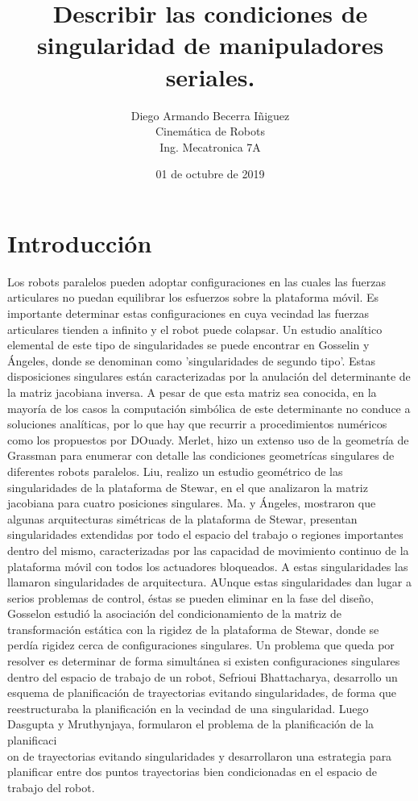 \documentclass[letter,openright,12pt,spanish]{report}
\title{\textbf{Describir las condiciones de singularidad de manipuladores seriales.}}
\author{Diego Armando Becerra Iñiguez\\
		Cinem\'atica de Robots\\
		Ing. Mecatronica 7A}
\date{01 de octubre de 2019}
\begin{document}
\maketitle

\section{Introducci\'on}

Los robots paralelos pueden adoptar configuraciones en las cuales las fuerzas articulares no puedan equilibrar los esfuerzos sobre la plataforma m\'ovil. Es importante determinar estas configuraciones en cuya vecindad las fuerzas articulares tienden a infinito y el robot puede colapsar. Un estudio anal\'itico elemental de este tipo de singularidades se puede encontrar en Gosselin y \'Angeles, donde se denominan como 'singularidades de segundo tipo'. Estas disposiciones singulares est\'an caracterizadas por la anulaci\'on del determinante de la matriz jacobiana inversa. A pesar de que esta matriz sea conocida, en la mayor\'ia de los casos la computaci\'on simb\'olica de este determinante no conduce a soluciones anal\'iticas, por lo que hay que recurrir a procedimientos num\'ericos como los propuestos por DOuady. Merlet, hizo un extenso uso de la geometr\'ia de Grassman para enumerar con detalle las condiciones geometr\'icas singulares de diferentes robots paralelos. Liu, realizo un estudio geom\'etrico de las singularidades de la plataforma de Stewar, en el que analizaron la matriz jacobiana para cuatro posiciones singulares. Ma. y \'Angeles, mostraron que algunas arquitecturas sim\'etricas de la plataforma de Stewar, presentan singularidades extendidas por todo el espacio del trabajo o regiones importantes dentro del mismo, caracterizadas por las capacidad de movimiento continuo de la plataforma m\'ovil con todos los actuadores bloqueados. A estas singularidades las llamaron singularidades de arquitectura. AUnque estas singularidades dan lugar a serios problemas de control, \'estas se pueden eliminar en la fase del diseño, Gosselon estudi\'o la asociaci\'on del condicionamiento de la matriz de transformaci\'on est\'atica con la rigidez de la plataforma de Stewar, donde se perd\'ia rigidez cerca de configuraciones singulares. Un problema que queda por resolver es determinar de forma simult\'anea si existen configuraciones singulares  dentro del espacio de trabajo de un robot, Sefrioui Bhattacharya, desarrollo un esquema de planificaci\'on de trayectorias evitando singularidades, de forma que reestructuraba la planificaci\'on en la vecindad de una singularidad. Luego Dasgupta y Mruthynjaya, formularon el problema de la planificaci\'on de la planificaci\\on de trayectorias evitando singularidades y desarrollaron una estrategia para planificar entre dos puntos trayectorias bien condicionadas en el espacio de trabajo del robot.
\end{document}
